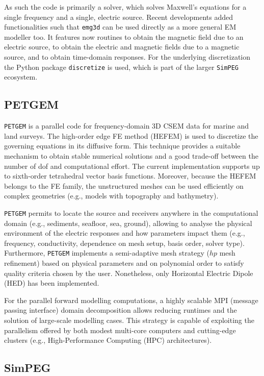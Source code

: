 \documentclass[onecolumn,extra,camera]{gji}
\newcommand{\emg}[2]{\texttt{emg#1#2}\xspace}
\newcommand{\simpeg}{\texttt{SimPEG}\xspace}
\newcommand{\discretize}{\texttt{discretize}\xspace}
\newcommand{\petgem}{\texttt{PETGEM}\xspace}
\begin{document}
As such the code is primarily a solver, which solves Maxwell's equations for a single frequency and a single, electric source. Recent developments added functionalities such that \emg3d can be used directly as a more general EM modeller too. It features now routines to obtain the magnetic field due to an electric source, to obtain the electric and magnetic fields due to a magnetic source, and to obtain time-domain responses. For the underlying discretization the Python package \discretize is used, which is part of the larger \simpeg ecosystem.

\subsection{PETGEM}

\petgem is a parallel code for frequency-domain 3D CSEM data for marine and land surveys. The high-order edge FE method (HEFEM) is used to discretize the governing equations in its diffusive form. This technique provides a suitable mechanism to obtain stable numerical solutions and a good trade-off between the number of dof and computational effort. The current implementation supports up to sixth-order tetrahedral vector basis functions. Moreover, because the HEFEM belongs to the FE family, the unstructured meshes can be used efficiently on complex geometries (e.g., models with topography and bathymetry).

\petgem permits to locate the source and receivers anywhere in the computational domain (e.g., sediments, seafloor, sea, ground), allowing to analyse the physical environment of the electric responses and how parameters impact them (e.g., frequency, conductivity, dependence on mesh setup, basis order, solver type). Furthermore, \petgem implements a semi-adaptive mesh strategy ($hp$ mesh refinement) based on physical parameters and on polynomial order to satisfy quality criteria chosen by the user. Nonetheless, only Horizontal Electric Dipole (HED) has been implemented.

For the parallel forward modelling computations, a highly scalable MPI (message passing interface) domain decomposition allows reducing runtimes and the solution of large-scale modelling cases. This strategy is capable of exploiting the parallelism offered by both modest multi-core computers and cutting-edge clusters (e.g., High-Performance Computing (HPC) architectures).

\subsection{SimPEG}
\end{document}
